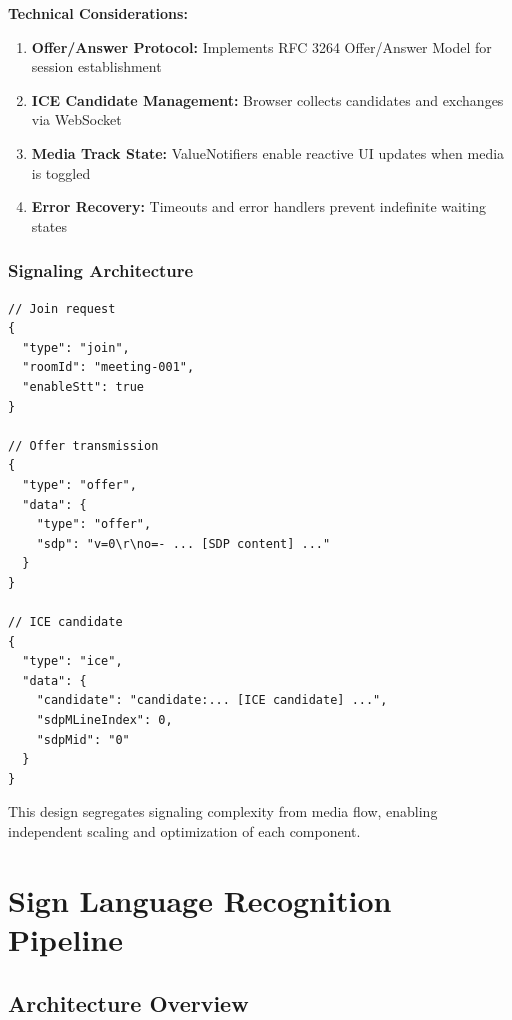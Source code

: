 \documentclass[11pt,a4paper,twoside]{report}
\begin{document}
\textbf{Technical Considerations:}

\begin{enumerate}
    \item \textbf{Offer/Answer Protocol:} Implements RFC 3264 Offer/Answer Model for session establishment
    \item \textbf{ICE Candidate Management:} Browser collects candidates and exchanges via WebSocket
    \item \textbf{Media Track State:} ValueNotifiers enable reactive UI updates when media is toggled
    \item \textbf{Error Recovery:} Timeouts and error handlers prevent indefinite waiting states
\end{enumerate}

\subsubsection{Signaling Architecture}
\label{subsubsec:signaling-architecture}

\begin{lstlisting}[style=json, caption={WebSocket signaling message format}, label=lst:signaling-messages]
// Join request
{
  "type": "join",
  "roomId": "meeting-001",
  "enableStt": true
}

// Offer transmission
{
  "type": "offer",
  "data": {
    "type": "offer",
    "sdp": "v=0\r\no=- ... [SDP content] ..."
  }
}

// ICE candidate
{
  "type": "ice",
  "data": {
    "candidate": "candidate:... [ICE candidate] ...",
    "sdpMLineIndex": 0,
    "sdpMid": "0"
  }
}
\end{lstlisting}

This design segregates signaling complexity from media flow, enabling independent scaling and optimization of each component.

\newpage

\section{Sign Language Recognition Pipeline}
\label{sec:recognition-pipeline}

\subsection{Architecture Overview}
\label{subsec:recognition-overview}
\end{document}
